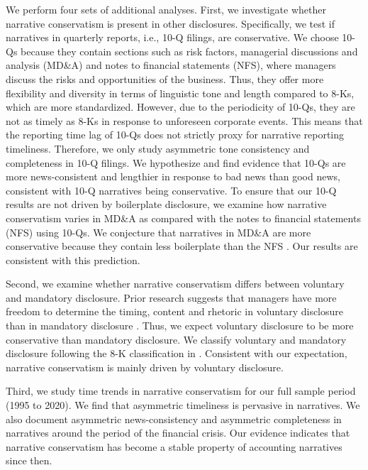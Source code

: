 \documentclass[letterpaper,12pt]{article}
\begin{document}
\begin{spacing}{1.5}
We perform four sets of additional analyses. First, we investigate whether narrative conservatism is present in other disclosures. Specifically, we test if narratives in quarterly reports, i.e., 10-Q filings, are conservative. We choose 10-Qs because they contain sections such as risk factors, managerial discussions and analysis (MD\&A) and notes to financial statements (NFS), where managers discuss the risks and opportunities of the business. Thus, they offer more flexibility and diversity in terms of linguistic tone and length compared to 8-Ks, which are more standardized. However, due to the periodicity of 10-Qs, they are not as timely as 8-Ks in response to unforeseen corporate events. This means that the reporting time lag of 10-Qs does not strictly proxy for narrative reporting timeliness. Therefore, we only study asymmetric tone consistency and completeness in 10-Q filings. We hypothesize and find evidence that 10-Qs are more news-consistent and lengthier in response to bad news than good news, consistent with 10-Q narratives being conservative. To ensure that our 10-Q results are not driven by boilerplate disclosure, we examine how narrative conservatism varies in MD\&A as compared with the notes to financial statements (NFS) using 10-Qs. We conjecture that narratives in MD\&A are more conservative because they contain less boilerplate than the NFS \cite{secFinancialReportingManual2019}. Our results are consistent with this prediction. 

Second, we examine whether narrative conservatism differs between voluntary and mandatory disclosure. Prior research suggests that managers have more freedom to determine the timing, content and rhetoric in voluntary disclosure than in mandatory disclosure \cite{segalAreManagersStrategic2016}. Thus, we expect voluntary disclosure to be more conservative than mandatory disclosure. We classify voluntary and mandatory disclosure following the 8-K classification in . Consistent with our expectation, narrative conservatism is mainly driven by voluntary disclosure. 

Third, we study time trends in narrative conservatism for our full sample period (1995 to 2020). We find that asymmetric timeliness is pervasive in narratives. We also document asymmetric news-consistency and asymmetric completeness in narratives around the period of the financial crisis. Our evidence indicates that narrative conservatism has become a stable property of accounting narratives since then.


\end{spacing}
\end{document}
